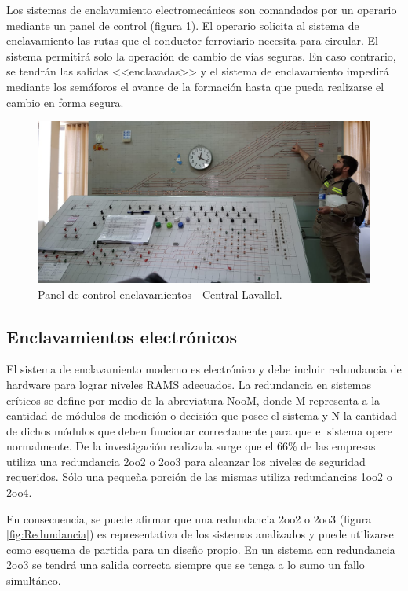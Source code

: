 			Los sistemas de enclavamiento electromecánicos son comandados por un operario mediante un panel de control (figura \ref{fig:Electromecanico}). El operario solicita al sistema de enclavamiento las rutas que el conductor ferroviario necesita para circular. El sistema permitirá solo la operación de cambio de vías seguras. En caso contrario, se tendrán las salidas <<enclavadas>> y el sistema de enclavamiento impedirá mediante los semáforos el avance de la formación hasta que pueda realizarse el cambio en forma segura.
		
			\begin{figure}[h!]
				\centering
				\includegraphics[scale=.27]{./Figures/Electromecanico}
				\caption{Panel de control enclavamientos - Central Lavallol.}
				\label{fig:Electromecanico}
			\end{figure}
			
		\subsection{Enclavamientos electrónicos}
		\label{sec:Redundancia}	
			
			El sistema de enclavamiento moderno es electrónico y debe incluir redundancia de hardware para lograr niveles RAMS adecuados. La redundancia en sistemas críticos se define por medio de la abreviatura NooM, donde M representa a la cantidad de módulos de medición o decisión que posee el sistema y N la cantidad de dichos módulos que deben funcionar correctamente para que el sistema opere normalmente\cite{cite17}. De la investigación realizada surge que el $66$\% de las empresas utiliza una redundancia 2oo2 o 2oo3 para alcanzar los niveles de seguridad requeridos\cite{Trenes,cite5,cite6,cite9,cite10,cite12,cite13,cite14,cite15}. Sólo una pequeña porción de las mismas utiliza redundancias 1oo2\cite{cite7} o 2oo4\cite{cite8}. 
			
			En consecuencia, se puede afirmar que una redundancia 2oo2 o 2oo3 (figura \ref{fig:Redundancia}) es representativa de los sistemas analizados y puede utilizarse como esquema de partida para un diseño propio. En un sistema con redundancia 2oo3 se tendrá una salida correcta siempre que se tenga a lo sumo un fallo simultáneo\citep{REDUNDANCIA}. 
			
